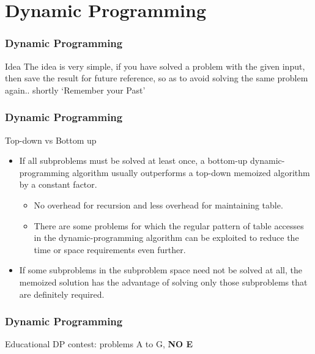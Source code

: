 \documentclass{beamer}
\begin{document}
  
  \section{Dynamic Programming}
  \begin{frame}
  \frametitle{Dynamic Programming}
    \begin{block}{Idea}
    The idea is very simple, if you have solved a problem with the given input, then save the result for future reference, so as to avoid solving the same problem again.. shortly ‘Remember your Past’
    \end{block}
  \end{frame}
  
  \begin{frame}
  \frametitle{Dynamic Programming}
    \begin{block}{Top-down vs Bottom up}
    \begin{itemize}
        \item If all subproblems must be solved at least once, a bottom-up dynamic-programming algorithm usually outperforms a top-down memoized algorithm by a constant factor.
        \begin{itemize}
            \item No overhead for recursion and less overhead for maintaining table.
            \item There are some problems for which the regular pattern of table accesses in the dynamic-programming algorithm can be exploited to reduce the time or space requirements even further.
        \end{itemize}
        \item If some subproblems in the subproblem space need not be solved at all, the memoized solution has the advantage of solving only those subproblems that are definitely required.

    \end{itemize}
    \end{block}
  \end{frame}
    
    \begin{frame}
    \frametitle{Dynamic Programming}
      \begin{huge}
        \begin{center}
          Educational DP contest: problems A to G, \textbf{NO E}
        \end{center}
      \end{huge}
    \end{frame}
    
    
\end{document}
